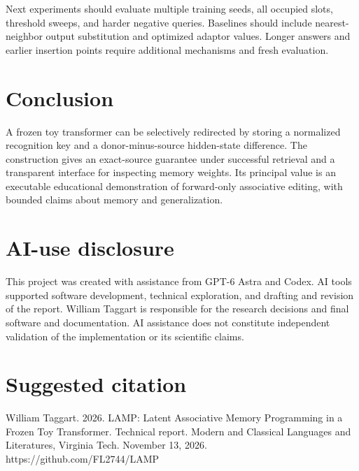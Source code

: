 \documentclass[manuscript,screen,nonacm]{acmart}
\begin{document}
Next experiments should evaluate multiple training seeds, all occupied slots, threshold sweeps, and harder negative queries. Baselines should include nearest-neighbor output substitution and optimized adaptor values. Longer answers and earlier insertion points require additional mechanisms and fresh evaluation.

\section{Conclusion}
A frozen toy transformer can be selectively redirected by storing a normalized recognition key and a donor-minus-source hidden-state difference. The construction gives an exact-source guarantee under successful retrieval and a transparent interface for inspecting memory weights. Its principal value is an executable educational demonstration of forward-only associative editing, with bounded claims about memory and generalization.

\section*{AI-use disclosure}
This project was created with assistance from GPT-6 Astra and Codex. AI tools supported software development, technical exploration, and drafting and revision of the report. William Taggart is responsible for the research decisions and final software and documentation. AI assistance does not constitute independent validation of the implementation or its scientific claims.




\section*{Suggested citation}
William Taggart. 2026. LAMP: Latent Associative Memory Programming in a Frozen Toy Transformer. Technical report. Modern and Classical Languages and Literatures, Virginia Tech. November 13, 2026. https://github.com/FL2744/LAMP
\end{document}
